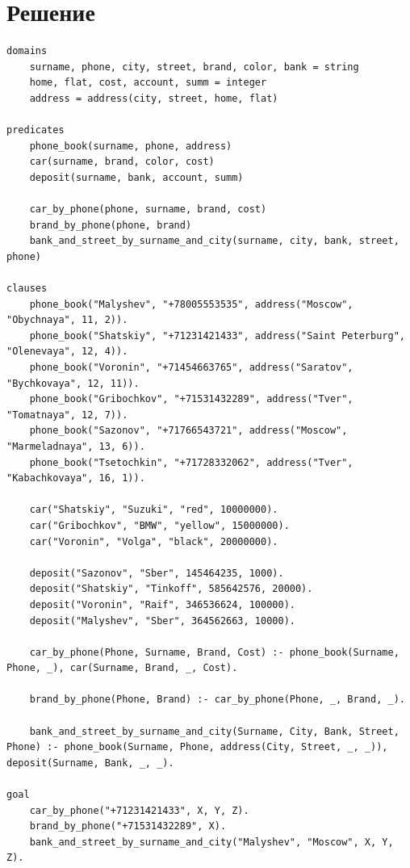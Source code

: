 \documentclass[12pt]{report}
\begin{document}
\section*{Решение}
\begin{lstlisting}
domains
	surname, phone, city, street, brand, color, bank = string
	home, flat, cost, account, summ = integer
	address = address(city, street, home, flat)
		
predicates
	phone_book(surname, phone, address)
	car(surname, brand, color, cost)
	deposit(surname, bank, account, summ)
	
	car_by_phone(phone, surname, brand, cost)
	brand_by_phone(phone, brand)
	bank_and_street_by_surname_and_city(surname, city, bank, street, phone)
	
clauses
	phone_book("Malyshev", "+78005553535", address("Moscow", "Obychnaya", 11, 2)).
	phone_book("Shatskiy", "+71231421433", address("Saint Peterburg", "Olenevaya", 12, 4)).
	phone_book("Voronin", "+71454663765", address("Saratov", "Bychkovaya", 12, 11)).
	phone_book("Gribochkov", "+71531432289", address("Tver", "Tomatnaya", 12, 7)).
	phone_book("Sazonov", "+71766543721", address("Moscow", "Marmeladnaya", 13, 6)).
	phone_book("Tsetochkin", "+71728332062", address("Tver", "Kabachkovaya", 16, 1)).
	
	car("Shatskiy", "Suzuki", "red", 10000000).
	car("Gribochkov", "BMW", "yellow", 15000000).
	car("Voronin", "Volga", "black", 20000000).
	
	deposit("Sazonov", "Sber", 145464235, 1000).
	deposit("Shatskiy", "Tinkoff", 585642576, 20000).
	deposit("Voronin", "Raif", 346536624, 100000).
	deposit("Malyshev", "Sber", 364562663, 10000).
	
	car_by_phone(Phone, Surname, Brand, Cost) :- phone_book(Surname, Phone, _), car(Surname, Brand, _, Cost).
	
	brand_by_phone(Phone, Brand) :- car_by_phone(Phone, _, Brand, _).
	
	bank_and_street_by_surname_and_city(Surname, City, Bank, Street, Phone) :- phone_book(Surname, Phone, address(City, Street, _, _)), deposit(Surname, Bank, _, _).
		
goal
	car_by_phone("+71231421433", X, Y, Z).
	brand_by_phone("+71531432289", X).
	bank_and_street_by_surname_and_city("Malyshev", "Moscow", X, Y, Z).
\end{lstlisting}
\end{document}
